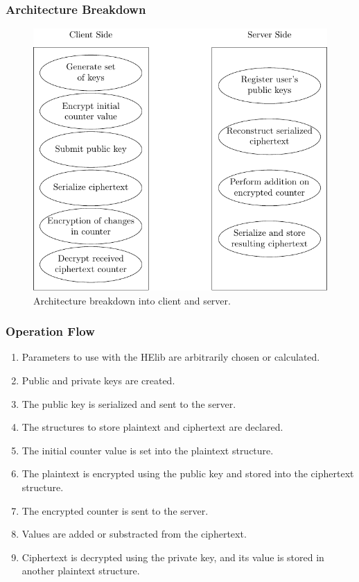 \documentclass{beamer}
\begin{document}
\begin{frame}
\frametitle{Architecture Breakdown}
\begin{figure}[H]
  \centering
  \includegraphics[scale=0.65]{../img/architecture}
 \caption{Architecture breakdown into client and server.}
 \label{fig:clientserver}
\end{figure}

\end{frame}
\begin{frame}
\frametitle{Operation Flow}
\begin{enumerate}
	\item Parameters to use with the HElib are arbitrarily chosen or calculated.
	\item Public and private keys are created.
	\item The public key is serialized and sent to the server.
	\item The structures to store plaintext and ciphertext are declared.
	\item The initial counter value is set into the plaintext structure.
	\item The plaintext is encrypted using the public key and stored into the ciphertext structure.
        \item The encrypted counter is sent to the server.
	\item Values are added or substracted from the ciphertext.
	\item Ciphertext is decrypted using the private key, and its value is stored in another plaintext structure.
\end{enumerate}
\end{frame}
\end{document}
